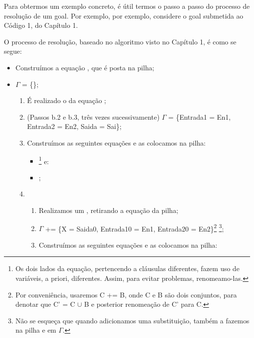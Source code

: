 Para obtermos um exemplo concreto, é útil termos o passo a passo do
processo de resolução de um goal. Por exemplo, por exemplo, considere
o goal  submetida ao Código 1, do
Capítulo 1.

O processo de resolução, baseado no algoritmo visto no Capítulo 1, é
como se segue:

\begin{itemize}
\item Construímos a equação , que é posta na pilha;
\item $\Gamma$ = \{\};
  \begin{enumerate}
  \item É realizado o  da equação
    ;
  \item (Passos b.2 e b.3, três vezes sucessivamente) $\Gamma$ =
    \{Entrada1 = En1, Entrada2 = En2, Saida = Sai\};
  \item Construímos as seguintes equações e as
    colocamos na pilha:
    \begin{itemize}
        \item {}\footnote{Os
          dois lados da equação, pertencendo a cláusulas diferentes,
          fazem uso de variáveis, a priori, diferentes. Assim, para
          evitar problemas, renomeamo-las.} e:
        \item {};
    \end{itemize}
  \item
    \begin{enumerate}
    \item Realizamos um , retirando a equação
       da pilha;
    \item $\Gamma$ += \{X = Saida0, Entrada10 = En1, Entrada20 =
      En2\}\footnote{Por conveniência, usaremos C += B, onde C e
        B são dois conjuntos, para denotar que C' = C $\cup$ B e
        posterior renomeação de C' para C.} \footnote{Não se
        esqueça que quando adicionamos uma substituição, também
        a fazemos na pilha e em $\Gamma$.};
    \item Construímos as seguintes equações e as colocamos na pilha:
      \begin{itemize}

\end{itemize}
\end{enumerate}
\end{enumerate}
\end{itemize}
